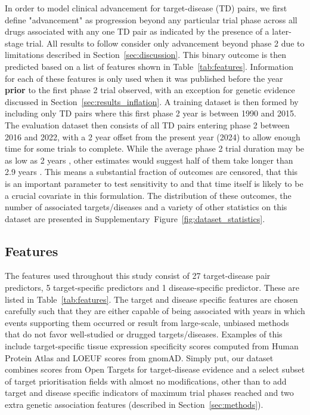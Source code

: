 \documentclass{article}
\begin{document}
In order to model clinical advancement for target-disease (TD) pairs, we first define "advancement" as progression beyond any particular trial phase across all drugs associated with any one TD pair as indicated by the presence of a later-stage trial. All results to follow consider only advancement beyond phase 2 due to limitations described in Section~\ref{sec:discussion}. This binary outcome is then predicted based on a list of features shown in Table~\ref{tab:features}. Information for each of these features is only used when it was published before the year \textbf{prior} to the first phase 2 trial observed, with an exception for genetic evidence discussed in Section~\ref{sec:results_inflation}. A training dataset is then formed by including only TD pairs where this first phase 2 year is between 1990 and 2015. The evaluation dataset then consists of all TD pairs entering phase 2 between 2016 and 2022, with a 2 year offset from the present year (2024) to allow enough time for some trials to complete. While the average phase 2 trial duration may be as low as 2 years \cite{fdaStepClinical}, other estimates would suggest half of them take longer than 2.9 years \cite{PMID:29394327}. This means a substantial fraction of outcomes are censored, that this is an important parameter to test sensitivity to and that time itself is likely to be a crucial covariate in this formulation. The distribution of these outcomes, the number of associated targets/diseases and a variety of other statistics on this dataset are presented in Supplementary~Figure~\ref{fig:dataset_statistics}.

\subsection{Features}
\label{sec:features}

The features used throughout this study consist of 27 target-disease pair predictors, 5 target-specific predictors and 1 disease-specific predictor. These are listed in Table~\ref{tab:features}. The target and disease specific features are chosen carefully such that they are either capable of being associated with years in which events supporting them occurred or result from large-scale, unbiased methods that do not favor well-studied or drugged targets/diseases. Examples of this include target-specific tissue expression specificity scores computed from Human Protein Atlas \cite{PMID:25613900} and LOEUF \cite{PMID:32461654} scores from gnomAD. Simply put, our dataset combines scores from Open Targets for target-disease evidence and a select subset of target prioritisation \cite{OT23.12release} fields with almost no modifications, other than to add target and disease specific indicators of maximum trial phases reached and two extra genetic association features (described in Section~\ref{sec:methods}).
\end{document}
